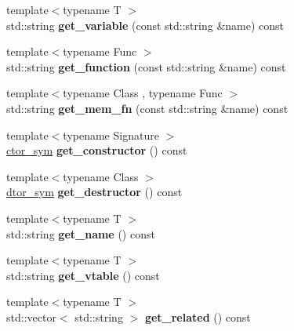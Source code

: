 \begin{DoxyCompactItemize}
\item 
{\footnotesize template$<$typename T $>$ }\\std\+::string {\bfseries get\+\_\+variable} (const std\+::string \&name) const \hypertarget{a00214_af2ce8bb42b3faced27dc0a04e1b69b75}{}\label{a00214_af2ce8bb42b3faced27dc0a04e1b69b75}

\item 
{\footnotesize template$<$typename Func $>$ }\\std\+::string {\bfseries get\+\_\+function} (const std\+::string \&name) const \hypertarget{a00214_ae1b55c8f8413e1e04add9204b9ea5720}{}\label{a00214_ae1b55c8f8413e1e04add9204b9ea5720}

\item 
{\footnotesize template$<$typename Class , typename Func $>$ }\\std\+::string {\bfseries get\+\_\+mem\+\_\+fn} (const std\+::string \&name) const \hypertarget{a00214_a413658267ea0a6b6b814a757bf739679}{}\label{a00214_a413658267ea0a6b6b814a757bf739679}

\item 
{\footnotesize template$<$typename Signature $>$ }\\\hyperlink{a00070}{ctor\+\_\+sym} {\bfseries get\+\_\+constructor} () const \hypertarget{a00214_ae3d2155c3551738b1a9f96fbec1056c6}{}\label{a00214_ae3d2155c3551738b1a9f96fbec1056c6}

\item 
{\footnotesize template$<$typename Class $>$ }\\\hyperlink{a00079}{dtor\+\_\+sym} {\bfseries get\+\_\+destructor} () const \hypertarget{a00214_a89f5339024ff1d41f4d5a56bb91965e1}{}\label{a00214_a89f5339024ff1d41f4d5a56bb91965e1}

\item 
{\footnotesize template$<$typename T $>$ }\\std\+::string {\bfseries get\+\_\+name} () const \hypertarget{a00214_a6891de99b2da89b3ae6c6182fd304641}{}\label{a00214_a6891de99b2da89b3ae6c6182fd304641}

\item 
{\footnotesize template$<$typename T $>$ }\\std\+::string {\bfseries get\+\_\+vtable} () const \hypertarget{a00214_a58dbd833bf98777bf38f4ff1b3824e7c}{}\label{a00214_a58dbd833bf98777bf38f4ff1b3824e7c}

\item 
{\footnotesize template$<$typename T $>$ }\\std\+::vector$<$ std\+::string $>$ {\bfseries get\+\_\+related} () const \hypertarget{a00214_af44ed6e7a680cd56ae69e55e2c252de5}{}\label{a00214_af44ed6e7a680cd56ae69e55e2c252de5}


\end{DoxyCompactItemize}

